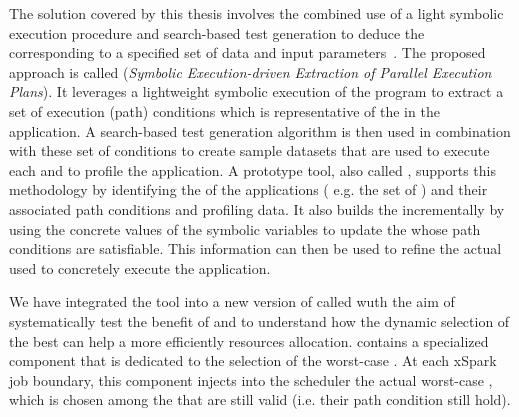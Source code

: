 



The solution covered by this thesis involves the combined use of a light symbolic execution procedure and search-based test generation to deduce the \plan corresponding to a specified set of data and input parameters~\cite{Baresi-Quattrocchi-Denaro:2019}. The proposed approach is called \dSymb (\textit{Symbolic Execution-driven Extraction of Parallel Execution Plans}).  It leverages a lightweight symbolic execution of the program to extract a set of execution (path) conditions which is representative of the \plans in the application. A search-based test generation algorithm is then used in combination with these set of conditions to create sample datasets that are used to execute each \plan and to profile the application. A prototype tool, also called \dSymb, supports this methodology by identifying the \model of the applications ( e.g. the set of \plans) and their associated path conditions and profiling data. It also builds the \model incrementally by using the concrete values of the symbolic variables to update the \plans whose path conditions are satisfiable. This information can then be used to refine the actual \plan used to concretely execute the application. 

We have integrated the tool into a new version of \cSpark called \tool wuth the aim of systematically test the benefit of \dSymb and to understand how the dynamic selection of the best \plan can help a more efficiently resources allocation. \tool contains a specialized   component that is dedicated to the selection of the worst-case \plan. At each xSpark job boundary, this component injects into the \cSpark scheduler the actual worst-case \plan, which is chosen among the \plans that are still valid (i.e. their path condition still hold). 

